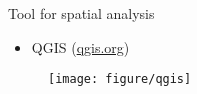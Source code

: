 \documentclass[serif, aspectratio=169]{beamer}
\begin{document}
\begin{frame}
{Tool for spatial analysis}

\begin{itemize}

\item QGIS (\url{qgis.org})

\end{itemize}

\begin{figure}
    \texttt{[image: figure/qgis]}
\end{figure}

\end{frame}


\begin{frame}[allowframebreaks]
\printbibliography
\end{frame}
\end{document}
